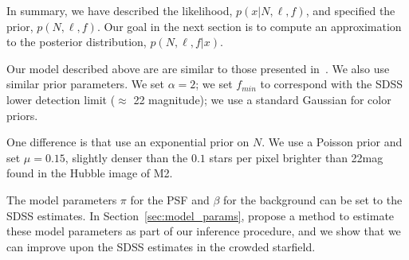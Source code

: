 In summary, we have described the likelihood,
$p(x | N, \ell, f)$, and specified the prior, $p(N, \ell, f)$. Our goal 
in the next section is to compute an approximation to the posterior distribution, $p(N, \ell, f | x)$. 

Our model described above are are similar to those 
presented in~\cite{Portillo_2017, Feder_2019}. We also use similar prior parameters. We set $\alpha = 2$; we set 
$f_{min}$ to correspond with the SDSS 
lower detection limit ($\approx$ 22 magnitude); we use a standard Gaussian for color priors. 

One difference is that \cite{Portillo_2017, Feder_2019} use an exponential prior on $N$. We use a Poisson prior and set $\mu = 0.15$, slightly denser than the $0.1$ stars per pixel 
brighter than 22mag found in the Hubble image of M2. 

The model parameters $\pi$ for the PSF and 
$\beta$ for the background can be set to the SDSS estimates. In Section~\ref{sec:model_params}, propose a method to estimate these model parameters as part of our inference procedure, and we show that we can improve upon the SDSS estimates in the crowded starfield. 

